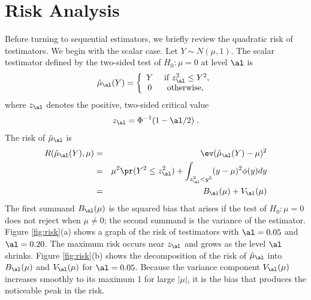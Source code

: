 \documentclass[12pt]{article}
\begin{document}
\section{ Risk Analysis}


 Before turning to sequential estimators, we briefly review the quadratic risk
 of testimators.  We begin with the scalar case.  Let $Y \sim N(\mu,1)$.  The
 scalar testimator defined by the two-sided test of $H_0: \mu=0$ at level $\al$
 is
 \begin{equation}
   \hat\mu_\al(Y) = \left\{
     \begin{array}{cc}
        Y & \mbox{ if } z_\al^2 \le Y^2, \cr
        0 & \mbox{ otherwise, }
      \end{array} \right.
 \label{eq:muHat}
 \end{equation}
 where $z_\al$ denotes the positive, two-sided critical value
 \begin{equation}
   z_\al = \Phi^{-1}(1-\al/2) \;.
 \label{eq:zAlpha}
 \end{equation}
 The risk of $\hat\mu_\al$ is
 \begin{eqnarray}
   R(\hat\mu_\al(Y), \mu) 
     &=& \ev(\hat\mu_\al(Y) - \mu)^2  \cr
     &=& \mu^2 \pr(Y^2 \le z_\al^2) 
         + \int_{z_\al^2<y^2} (y-\mu)^2 \phi(y) dy \cr
     &=& B_\al(\mu) + V_\al(\mu)
 \label{eq:risk_mu_al}
 \end{eqnarray}
 The first summand $B_\al(\mu)$ is the squared bias that arises if the test of
 $H_0: \mu=0$ does not reject when $\mu \ne 0$; the second summand is the
 variance of the estimator.  Figure \ref{fig:risk}(a) shows a graph of the risk
 of testimators with $\al=0.05$ and $\al = 0.20$.  The maximum risk occurs
 near $z_\al$ and grows as the level $\al$ shrinks.  Figure \ref{fig:risk}(b) shows
 the decomposition of the risk of $\hat\mu_\al$ into $B_\al(\mu)$ and
 $V_\al(\mu)$ for $\al = 0.05$.  Because the variance component $V_\al(\mu)$
 increases smoothly to its maximum 1 for large $|\mu|$, it is the bias that
 produces the noticeable peak in the risk.
\end{document}
